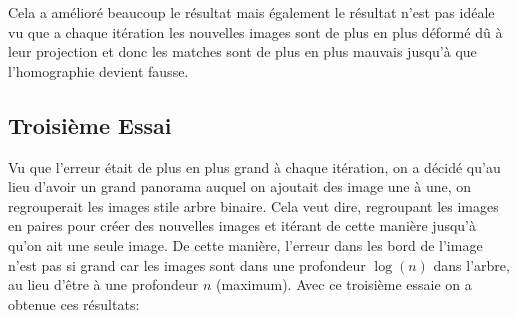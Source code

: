 \documentclass[11pt]{article}
\begin{document}
Cela a amélioré beaucoup le résultat mais également le résultat n’est pas idéale vu que a chaque itération les nouvelles images sont de plus en plus déformé dû à leur projection et donc les matches sont de plus en plus mauvais jusqu’à que l’homographie devient fausse.

\subsection{Troisième Essai}

Vu que l’erreur était de plus en plus grand à chaque itération, on a décidé qu’au lieu d’avoir un grand panorama auquel on ajoutait des image une à une, on regrouperait les images stile arbre binaire. Cela veut dire, regroupant les images en paires pour créer des nouvelles images et itérant de cette manière jusqu’à qu’on ait une seule image. De cette manière, l’erreur dans les bord de l’image n’est pas si grand car les images sont dans une profondeur $\log(n)$ dans l’arbre, au lieu d’être à une profondeur $n$ (maximum).
Avec ce troisième essaie on a obtenue ces résultats:
\end{document}
